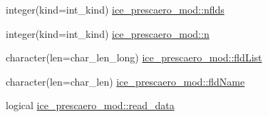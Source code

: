 \begin{DoxyCompactItemize}
\item 
integer(kind=int\_\-kind) \hyperlink{namespaceice__prescaero__mod_ab653a95f175ec939e8476b301828c31e}{ice\_\-prescaero\_\-mod::nflds}
\item 
integer(kind=int\_\-kind) \hyperlink{namespaceice__prescaero__mod_a9aac3151343a550064a4ea724d9cdb6f}{ice\_\-prescaero\_\-mod::n}
\item 
character(len=char\_\-len\_\-long) \hyperlink{namespaceice__prescaero__mod_a3be7ab6e22248b38d141107dd0ee2a59}{ice\_\-prescaero\_\-mod::fldList}
\item 
character(len=char\_\-len) \hyperlink{namespaceice__prescaero__mod_a3ec9a560b31f3c5c6bc587e700ee9570}{ice\_\-prescaero\_\-mod::fldName}
\item 
logical \hyperlink{namespaceice__prescaero__mod_af2c2ae945aa6208a444abc903ead27d9}{ice\_\-prescaero\_\-mod::read\_\-data}
\end{DoxyCompactItemize}
